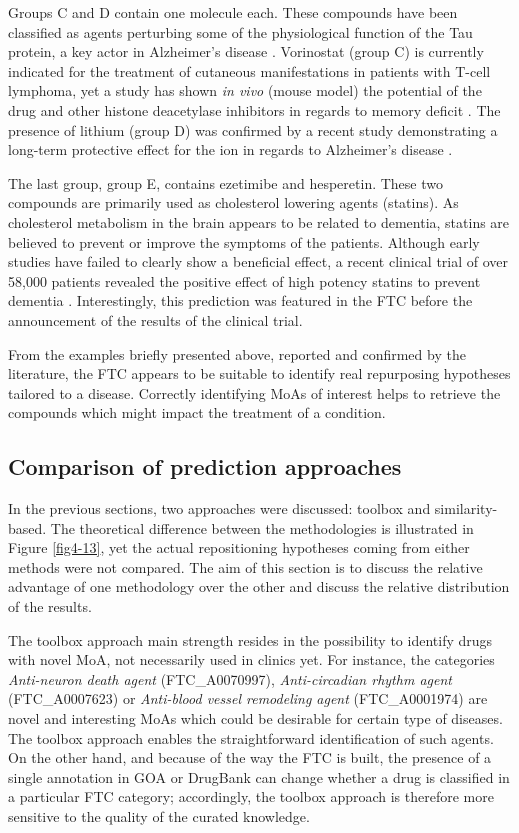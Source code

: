 Groups C and D contain one molecule each. These compounds have been classified as agents perturbing some of the physiological function of the Tau protein, a key actor in Alzheimer's disease \citep{grundke1986abnormal}. Vorinostat (group C) is currently indicated for the treatment of cutaneous manifestations in patients with T-cell lymphoma, yet a study has shown \emph{in vivo} (mouse model) the potential of the drug and other histone deacetylase inhibitors in regards to memory deficit \citep{kilgore2010inhibitors}. The presence of lithium (group D) was confirmed by a recent study demonstrating a long-term protective effect for the ion in regards to Alzheimer's disease \citep{young2011more}.

The last group, group E, contains ezetimibe and hesperetin. These two compounds are primarily used as cholesterol lowering agents (statins). As cholesterol metabolism in the brain appears to be related to dementia, statins are believed to prevent or improve the symptoms of the patients. Although early studies \citep{wolozin2004cholesterol} have failed to clearly show a beneficial effect, a recent clinical trial of over 58,000 patients revealed the positive effect of high potency statins to prevent dementia \citep{esc13}. Interestingly, this prediction was featured in the FTC before the announcement of the results of the clinical trial.

From the examples briefly presented above, reported and confirmed by the literature, the FTC appears to be suitable to identify real repurposing hypotheses tailored to a disease. Correctly identifying MoAs of interest helps to retrieve the compounds which might impact the treatment of a condition.

\subsection{Comparison of prediction approaches}
In the previous sections, two approaches were discussed: toolbox and similarity-based. The theoretical difference between the methodologies is illustrated in Figure \ref{fig4-13}, yet the actual repositioning hypotheses coming from either methods were not compared. The aim of this section is to discuss the relative advantage of one methodology over the other and discuss the relative distribution of the results.

The toolbox approach main strength resides in the possibility to identify drugs with novel MoA, not necessarily used in clinics yet. For instance, the categories \emph{Anti-neuron death agent} (FTC\_A0070997), \emph{Anti-circadian rhythm agent} (FTC\_A0007623) or \emph{Anti-blood vessel remodeling agent} (FTC\_A0001974) are novel and interesting MoAs which could be desirable for certain type of diseases. The toolbox approach enables the straightforward identification of such agents. On the other hand, and because of the way the FTC is built, the presence of a single annotation in GOA or DrugBank can change whether a drug is classified in a particular FTC category; accordingly, the toolbox approach is therefore more sensitive to the quality of the curated knowledge.

